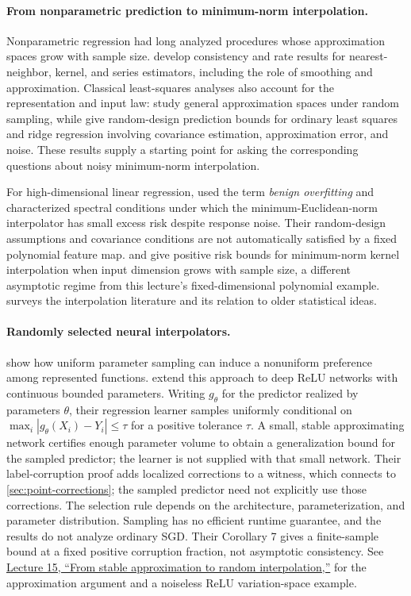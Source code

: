 \documentclass[11pt,twoside]{article}
\theoremstyle{definition}
\theoremstyle{remark}
\begin{document}
\paragraph{From nonparametric prediction to minimum-norm interpolation.}
Nonparametric regression had long analyzed procedures whose approximation
spaces grow with sample size. \citet{gyorfi2002} develop consistency and
rate results for nearest-neighbor, kernel, and series estimators, including
the role of smoothing and approximation. Classical least-squares analyses
also account for the representation and input law: \citet{cohen2013}
study general approximation spaces under random sampling, while
\citet{hsu2012} give random-design prediction bounds for ordinary least
squares and ridge regression involving covariance estimation,
approximation error, and noise. These results supply a starting point for
asking the corresponding questions about noisy minimum-norm interpolation.

For high-dimensional linear regression, \citet{bartlett2020} used the term
\emph{benign overfitting} and characterized spectral conditions under which
the minimum-Euclidean-norm interpolator has small excess risk despite
response noise. Their random-design assumptions and covariance conditions
are not automatically satisfied by a fixed polynomial feature map.
\citet{liang2020} and \citet{liang2020multiple} give positive risk bounds
for minimum-norm kernel interpolation when input dimension grows with
sample size, a different asymptotic regime from this lecture's
fixed-dimensional polynomial example. \citet{belkin2021} surveys the
interpolation literature and its relation to older statistical ideas.

\paragraph{Randomly selected neural interpolators.}
\citet{buzaglo2024} show how uniform parameter sampling can induce a
nonuniform preference among represented functions. \citet{madhowwang2026}
extend this approach to deep ReLU networks with continuous bounded
parameters. Writing $g_\theta$ for the predictor realized by parameters
$\theta$, their regression learner samples uniformly conditional on
$\max_i|g_\theta(X_i)-Y_i|\leq\tau$ for a positive tolerance $\tau$.
A small, stable approximating network certifies enough parameter volume
to obtain a generalization bound for the sampled predictor; the learner
is not supplied with that small network. Their label-corruption proof adds
localized corrections to a witness, which connects to
\cref{sec:point-corrections}; the sampled predictor need not explicitly
use those corrections. The selection rule depends on the architecture,
parameterization, and parameter distribution. Sampling has no efficient
runtime guarantee, and the results do not analyze ordinary SGD. Their
Corollary 7 gives a finite-sample bound at a fixed positive corruption
fraction, not asymptotic consistency. See
\href{lecture15.pdf\#sec:deep-lifts}{Lecture 15, ``From stable
approximation to random interpolation,''} for the approximation argument
and a noiseless ReLU variation-space example.
\end{document}
